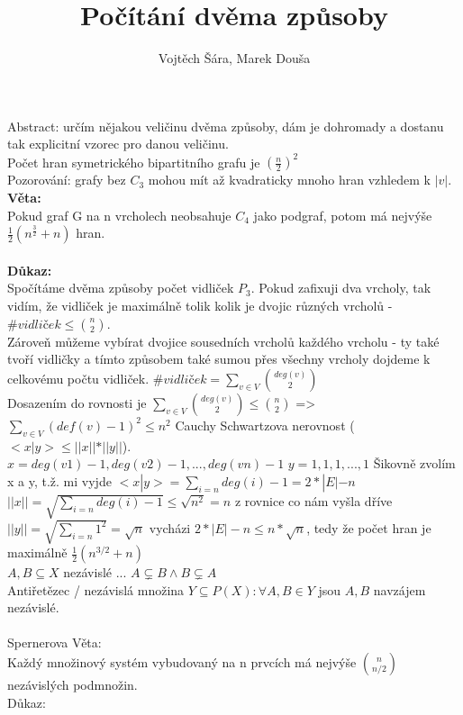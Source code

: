 \documentclass{article}
\title{Počítání dvěma způsoby}
\author{Vojtěch Šára, Marek Douša}
\begin{document}
\maketitle
Abstract: určím nějakou veličinu dvěma způsoby, dám je dohromady a dostanu tak explicitní vzorec pro danou veličinu.\\
Počet hran symetrického bipartitního grafu je $(\frac{n}{2})^{2}$\\
Pozorování: grafy bez $C_{3}$ mohou mít až kvadraticky mnoho hran vzhledem k $|v|$.\\
\textbf{Věta:}\\
Pokud graf G na n vrcholech neobsahuje $C_{4}$ jako podgraf, potom má 
nejvýše $\frac{1}{2}(n^{\frac{3}{2}}+n)$ hran.\\\\
\textbf{Důkaz:}\\
Spočítáme dvěma způsoby počet vidliček $P_{3}$. Pokud zafixuji dva vrcholy, tak vidím, že vidliček je maximálně
tolik kolik je dvojic různých vrcholů - $\# vidliček \leq \binom{n}{2}$.\\ 
Zároveň můžeme vybírat dvojice sousedních vrcholů každého vrcholu - ty také tvoří vidličky a tímto způsobem
také sumou přes všechny vrcholy dojdeme k celkovému počtu vidliček.
$\# vidliček = \sum_{v \in V} \binom{deg(v)}{2}$\\
Dosazením do rovnosti je $\sum_{v \in V} \binom{deg(v)}{2} \leq \binom{n}{2}$ => $\sum_{v \in V} (def(v)-1)^2 \leq n^2$
Cauchy Schwartzova nerovnost ($<x|y> \leq ||x||*||y||$). \\
$x={deg(v1)-1,deg(v2)-1},...,deg(vn)-1$
$y={1,1,1,...,1}$
Šikovně zvolím x a y, t.ž. mi vyjde $<x|y> = \sum_{i = n} deg(i)-1 = 2*|E| - n$ \\
$||x|| = \sqrt{\sum_{i = n} deg(i)-1} \leq \sqrt{n^2} = n$ z rovnice co nám vyšla dříve
$||y|| = \sqrt{\sum_{i=n} 1^2}=\sqrt{n}$
vycházi $2*|E| - n \leq n*\sqrt{n}$, tedy že počet hran je maximálně $\frac{1}{2}(n^{3/2} + n)$ \\
$A,B \subseteq X$ nezávislé ... $A \subsetneq B \wedge B \subsetneq A$\\
Antiřetězec / nezávislá množina $Y \subseteq P(X): \forall A,B \in Y$ jsou $A,B$ navzájem nezávislé.\\\\
Spernerova Věta:\\
Každý množinový systém vybudovaný na n prvcích má nejvýše $\binom{n}{n/2}$ nezávislých podmnožin.\\
Důkaz:\\
\end{document}
